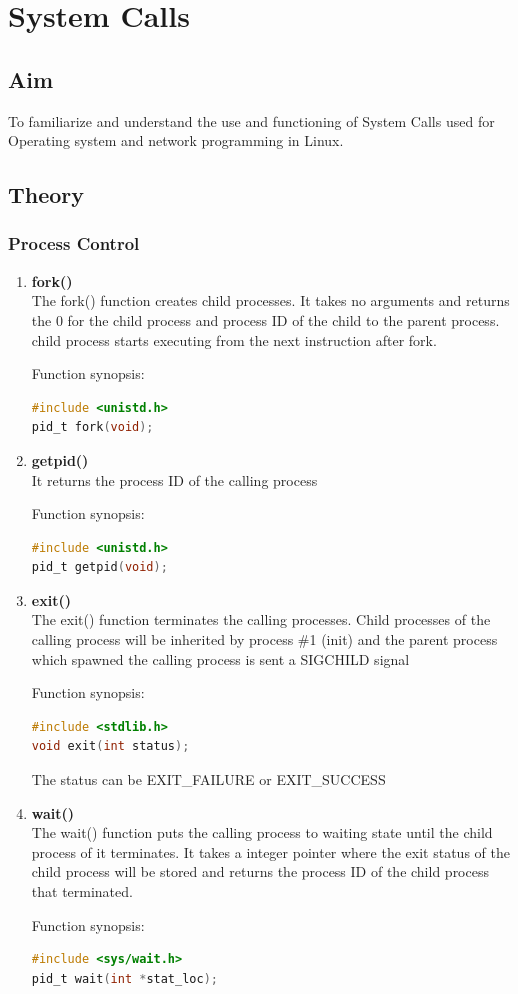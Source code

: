 \section{System Calls}
\subsection{Aim}
To familiarize and understand the use and functioning of System Calls used for Operating
system and network programming in Linux.
\subsection{Theory}
\subsubsection{Process Control}
\begin{enumerate}
	\item \textbf{fork()} \\
	The fork() function creates child processes. It takes no arguments and returns
	the 0 for the child process and process ID of the child to the parent process. child
	process starts executing from the next instruction after fork.

	Function synopsis:
	\begin{lstlisting}[language=C]
#include <unistd.h>
pid_t fork(void);
	\end{lstlisting}

	\item \textbf{getpid()} \\
	It returns the process ID of the calling process

	Function synopsis:
	\begin{lstlisting}[language=C]
#include <unistd.h>
pid_t getpid(void);
	\end{lstlisting}

	\item \textbf{exit()} \\
	The exit() function terminates the calling processes. Child processes of the calling
	process will be inherited by process \#1 (init) and the parent process which spawned the
	calling process is sent a SIGCHILD signal

	Function synopsis:
	\begin{lstlisting}[language=C]
#include <stdlib.h>
void exit(int status);
	\end{lstlisting}

	The status can be EXIT\_FAILURE or EXIT\_SUCCESS

	\item \textbf{wait()} \\
	The wait() function puts the calling process to waiting state until the child process of
	it terminates. It takes a integer pointer where the exit status of the child process will 
	be stored and returns the process ID of the child process that terminated.

	Function synopsis:
	\begin{lstlisting}[language=C]
#include <sys/wait.h>
pid_t wait(int *stat_loc);
	\end{lstlisting}
\end{enumerate}



